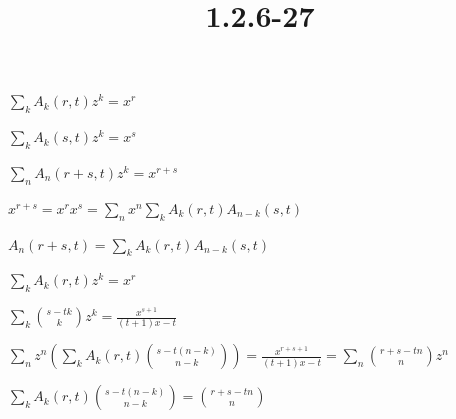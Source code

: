 \documentclass{article}
\title{1.2.6-27}
\begin{document}
\maketitle

$\sum_{k} A_k(r,t)z^k = x^r$

$\sum_{k} A_k(s,t)z^k = x^s$

$\sum_{n} A_n(r+s,t)z^k = x^{r+s}$

$x^{r+s} = x^r x^s = \sum_{n} x^n \sum_{k} A_k(r,t)A_{n-k}(s,t)$

$A_n(r+s,t) = \sum_{k} A_k(r,t)A_{n-k}(s,t)$

$\sum_{k} A_k(r,t)z^k = x^r$

$\sum_k \binom{s-tk}{k}z^k = \frac{x^{s+1}}{(t+1)x-t}$

$\sum_{n} z^n (\sum_k A_k(r,t) \binom{s-t(n-k)}{n-k}) = \frac{x^{r+s+1}}{(t+1)x - t} = \sum_{n}\binom{r+s-tn}{n}z^n$

$\sum_k A_k(r,t) \binom{s-t(n-k)}{n-k} = \binom{r+s-tn}{n}$
\end{document}
